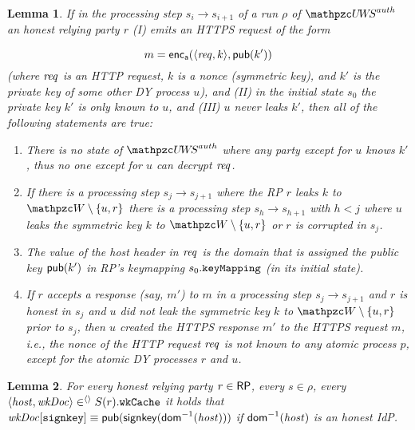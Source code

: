 \documentclass[letterpaper,onecolumn,10pt]{article}
\newtheorem{lemma}{Lemma}
\begin{document}
\begin{lemma}\label{lemma:k-does-not-leak-from-honest-rp} 
  If in the processing step $s_i \rightarrow s_{i+1}$ of a run $\rho$
  of $\uppressoauthwebsystem$ an honest relying party $r$ (I) emits an HTTPS
  request of the form

  \[ m = \mathsf{enc}_\mathsf{a}(\langle\mathit{req}, k\rangle,\mathsf{pub}(k')) \]
%
  (where $\mathit{req}$ is an HTTP request, $k$ is a nonce (symmetric
  key), and $k'$ is the private key of some other DY process $u$), and (II) in the
  initial state $s_0$ the private key $k'$ is only known to $u$, and
  (III) $u$ never leaks $k'$, then all of the following
  statements are true:
  \begin{enumerate}
  \item There is no state of $\uppressoauthwebsystem$ where any party except
    for $u$ knows $k'$, thus no one except for $u$ can
    decrypt $\mathit{req}$.
    \label{prop:attacker-cannot-decrypt-spresso}
  \item If there is a processing step $s_j \rightarrow s_{j+1}$ where
    the RP $r$ leaks $k$ to $\bidsystem \setminus \{u, r\}$ there
    is a processing step $s_h \rightarrow s_{h+1}$ with $h < j$
    where $u$ leaks the symmetric key $k$ to $\bidsystem \setminus
    \{u,r\}$ or $r$ is corrupted in
    $s_j$. \label{prop:k-doesnt-leak-spresso}
  \item The value of the host header in $\mathit{req}$ is the domain that
    is assigned the public key $\mathsf{pub}(k')$ in RP's keymapping
    $s_0.\mathtt{keyMapping}$ (in its initial
    state). \label{prop:host-header-matches-spresso}
  \item If $r$ accepts a response (say, $m'$) to $m$ in a processing step $s_j
    \rightarrow s_{j+1}$ and $r$ is honest in $s_j$ and $u$ did not
    leak the symmetric key $k$ to $\bidsystem \setminus \{u,r\}$ prior
    to $s_j$, then $u$ created the HTTPS response $m'$ to the HTTPS
    request $m$, i.e., the nonce of the HTTP request $\mathit{req}$ is not known to
    any atomic process $p$, except for the atomic DY processes $r$ and
    $u$.\label{prop:only-owner-answers-spresso}
  \end{enumerate}
\end{lemma}

\begin{lemma}\label{lemma:wkcache-never-lies}
  For every honest relying party $r \in \mathsf{RP}$, every $s \in \rho$, every
  $\langle\mathit{host}, \mathit{wkDoc}\rangle \in^{\langle\rangle} S(r).\mathtt{wkCache}$ it holds
  that $\mathit{wkDoc}[\mathtt{signkey}] \equiv
  \mathsf{pub}(\mathsf{signkey}(\mathsf{dom}^{-1}(\mathit{host})))$ if
  $\mathsf{dom}^{-1}(\mathit{host})$ is an honest IdP.
\end{lemma}
\end{document}
